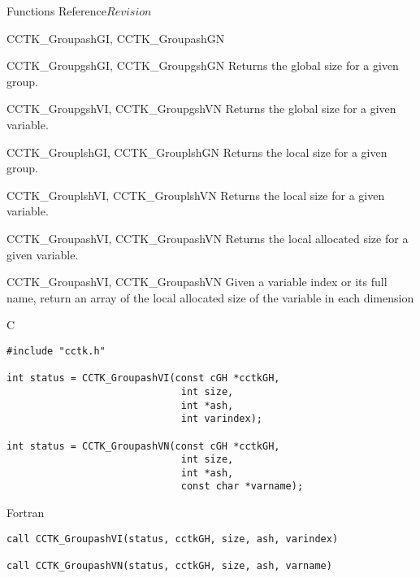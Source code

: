 \begin{cactuspart}{ Functions Reference}{}{$Revision$}
\begin{FunctionDescription}{CCTK\_GroupashGI, CCTK\_GroupashGN}
\begin{SeeAlsoSection}
\begin{SeeAlso}{CCTK\_GroupgshGI, CCTK\_GroupgshGN}
Returns the global size for a given group.
\end{SeeAlso}
\begin{SeeAlso}{CCTK\_GroupgshVI, CCTK\_GroupgshVN}
Returns the global size for a given variable.
\end{SeeAlso}
\begin{SeeAlso}{CCTK\_GrouplshGI, CCTK\_GrouplshGN}
Returns the local size for a given group.
\end{SeeAlso}
\begin{SeeAlso}{CCTK\_GrouplshVI, CCTK\_GrouplshVN}
Returns the local size for a given variable.
\end{SeeAlso}
\begin{SeeAlso}{CCTK\_GroupashVI, CCTK\_GroupashVN}
Returns the local allocated size for a given variable.
\end{SeeAlso}
\end{SeeAlsoSection}
\end{FunctionDescription}


\begin{FunctionDescription}{CCTK\_GroupashVI, CCTK\_GroupashVN}
\label{CCTK-GroupashVI}
\label{CCTK-GroupashVN}
Given a variable index or its full name, return an array of the local
allocated size of the variable in each dimension

\begin{SynopsisSection}
\begin{Synopsis}{C}
\begin{verbatim}
#include "cctk.h"

int status = CCTK_GroupashVI(const cGH *cctkGH,
                              int size,
                              int *ash,
                              int varindex);

int status = CCTK_GroupashVN(const cGH *cctkGH,
                              int size,
                              int *ash,
                              const char *varname);
\end{verbatim}
\end{Synopsis}
\begin{Synopsis}{Fortran}
\begin{verbatim}
call CCTK_GroupashVI(status, cctkGH, size, ash, varindex)

call CCTK_GroupashVN(status, cctkGH, size, ash, varname)


\end{verbatim}
\end{Synopsis}
\end{SynopsisSection}
\end{FunctionDescription}
\end{cactuspart}
